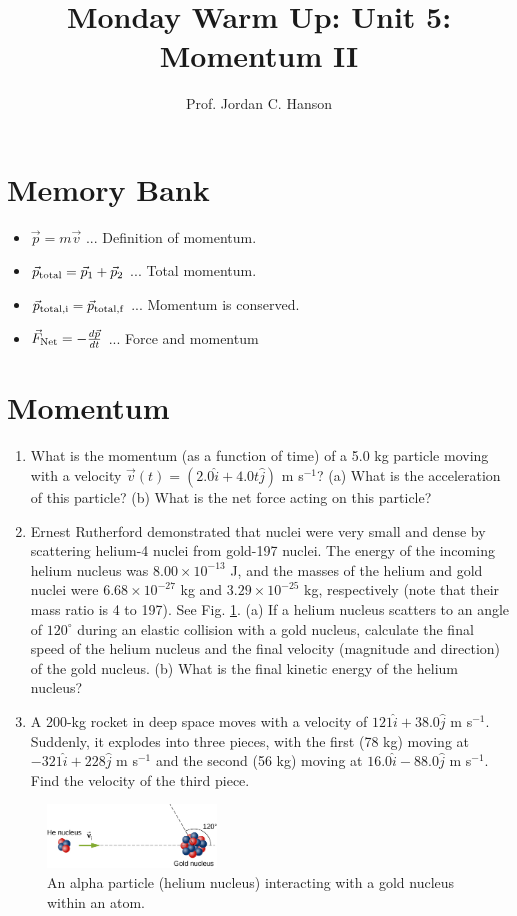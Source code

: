 \documentclass{article}
\begin{document}
\twocolumn

\title{Monday Warm Up: Unit 5: Momentum II}
\author{Prof. Jordan C. Hanson}

\maketitle

\section{Memory Bank}

\begin{itemize}
\item $\vec{p} = m\vec{v}$ ... Definition of momentum.
\item $\vec{p}_{\rm total} = \vec{p}_1 + \vec{p}_2$ ... Total momentum.
\item $\vec{p}_{\rm total,i} = \vec{p}_{\rm total,f}$ ... Momentum is conserved.
\item $\vec{F}_{\rm Net} = -\frac{d\vec{p}}{dt}$ ... Force and momentum
\end{itemize}

\section{Momentum}

\begin{enumerate}
\item What is the momentum (as a function of time) of a 5.0 kg particle moving with a velocity $\vec{v}(t)=(2.0\hat{i}+4.0t\hat{j})$ m s$^{-1}$? (a) What is the acceleration of this particle? (b) What is the net force acting on this particle? \\ \vspace{3cm}
\item Ernest Rutherford demonstrated that nuclei were very small and dense by scattering helium-4 nuclei from gold-197 nuclei. The energy of the incoming helium nucleus was $8.00\times 10^{-13}$ J, and the masses of the helium and gold nuclei were $6.68\times 10^{-27}$ kg and $3.29\times 10^{-25}$ kg, respectively (note that their mass ratio is 4 to 197). See Fig. \ref{fig:1}.  (a) If a helium nucleus scatters to an angle of $120^{\circ}$ during an elastic collision with a gold nucleus, calculate the final speed of the helium nucleus and the final velocity (magnitude and direction) of the gold nucleus.  (b) What is the final kinetic energy of the helium nucleus? \\ \vspace{5cm}
\item A 200-kg rocket in deep space moves with a velocity of $121\hat{i}+38.0\hat{j}$ m s$^{-1}$. Suddenly, it explodes into three pieces, with the first (78 kg) moving at $−321\hat{i}+228\hat{j}$ m s$^{-1}$ and the second (56 kg) moving at $16.0\hat{i} - 88.0\hat{j}$ m s$^{-1}$. Find the velocity of the third piece.
\end{enumerate}

\begin{figure}
\centering
\includegraphics[width=0.4\textwidth]{figures/nuclei.jpeg}
\caption{\label{fig:1} An alpha particle (helium nucleus) interacting with a gold nucleus within an atom.}
\end{figure}
\end{document}
